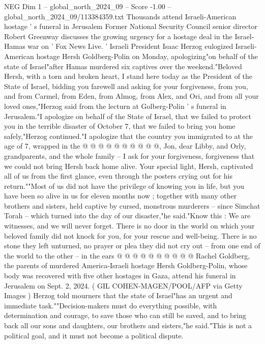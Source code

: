 \begin{textsample}{NEG Dim 1 – global\_north\_2024\_09 – Score -1.00 – global\_north\_2024\_09/113384359.txt}  \label{ex:f1_neg_020}
Thousands attend Israeli-American hostage ' s funeral in Jerusalem Former National Security Council senior director Robert Greenway discusses the growing urgency for a hostage deal in the Israel-Hamas war on ' Fox News Live. ' Israeli President Isaac Herzog eulogized Israeli-American hostage Hersh Goldberg-Polin on Monday, apologizing"on behalf of the state of Israel"after Hamas murdered six captives over the weekend."Beloved Hersh, with a torn and broken heart, I stand here today as the President of the State of Israel, bidding you farewell and asking for your forgiveness, from you, and from Carmel, from Eden, from Almog, from Alex, and Ori, and from all your loved ones,"Herzog said from the lecturn at Golberg-Polin ' s funeral in Jerusalem."I apologize on behalf of the State of Israel, that we failed to protect you in the terrible disaster of October 7, that we failed to bring you home safely,"Herzog continued."I apologize that the country you immigrated to at the age of 7, wrapped in the @ @ @ @ @ @ @ @ @ @, Jon, dear Libby, and Orly, grandparents, and the whole family -- I ask for your forgiveness, forgiveness that we could not bring Hersh back home alive.
Your special light, Hersh, captivated all of us from the first glance, even through the posters crying out for his return.""Most of us did not have the privilege of knowing you in life, but you have been so alive in us for eleven months now ; together with many other brothers and sisters, held captive by cursed, monstrous murderers -- since Simchat Torah -- which turned into the day of our disaster,"he said."Know this : We are witnesses, and we will never forget.
There is no door in the world on which your beloved family did not knock for you, for your rescue and well-being.
There is no stone they left unturned, no prayer or plea they did not cry out -- from one end of the world to the other -- in the ears @ @ @ @ @ @ @ @ @ @ Rachel Goldberg, the parents of murdered America-Israeli hostage Hersh Goldberg-Polin, whose body was recovered with five other hostages in Gaza, attend his funeral in Jerusalem on Sept. 2, 2024. ( GIL COHEN-MAGEN/POOL/AFP via Getty Images ) Herzog told mourners that the state of Israel"has an urgent and immediate task.""Decision-makers must do everything possible, with determination and courage, to save those who can still be saved, and to bring back all our sons and daughters, our brothers and sisters,"he said."This is not a political goal, and it must not become a political dispute.

\end{textsample}
